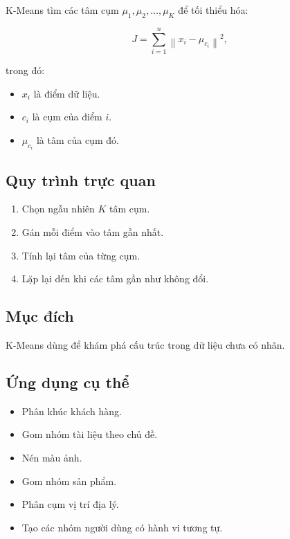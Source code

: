 \documentclass[12pt,a4paper]{report}
\begin{document}
K-Means tìm các tâm cụm \(\mu_1,\mu_2,\ldots,\mu_K\) để tối thiểu hóa:

\begin{equation}
J
=
\sum_{i=1}^{n}
\left\|
x_i-\mu_{c_i}
\right\|^2,
\end{equation}

trong đó:

\begin{itemize}[leftmargin=1.5em]
    \item \(x_i\) là điểm dữ liệu.
    \item \(c_i\) là cụm của điểm \(i\).
    \item \(\mu_{c_i}\) là tâm của cụm đó.
\end{itemize}

\subsection{Quy trình trực quan}

\begin{enumerate}[leftmargin=1.8em]
    \item Chọn ngẫu nhiên \(K\) tâm cụm.
    \item Gán mỗi điểm vào tâm gần nhất.
    \item Tính lại tâm của từng cụm.
    \item Lặp lại đến khi các tâm gần như không đổi.
\end{enumerate}

\subsection{Mục đích}

K-Means dùng để khám phá cấu trúc trong dữ liệu chưa có nhãn.

\subsection{Ứng dụng cụ thể}

\begin{itemize}[leftmargin=1.5em]
    \item Phân khúc khách hàng.
    \item Gom nhóm tài liệu theo chủ đề.
    \item Nén màu ảnh.
    \item Gom nhóm sản phẩm.
    \item Phân cụm vị trí địa lý.
    \item Tạo các nhóm người dùng có hành vi tương tự.
\end{itemize}
\end{document}
